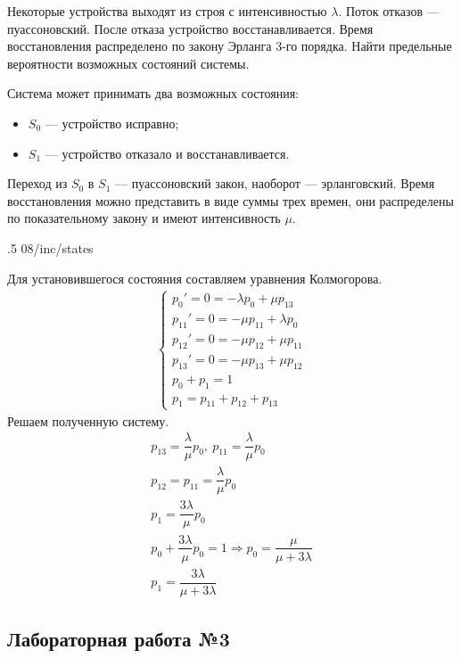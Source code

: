 Некоторые устройства выходят из строя с интенсивностью $\lambda$. Поток отказов --- пуассоновский. После отказа устройство восстанавливается. Время восстановления распределено по закону Эрланга 3-го порядка. Найти предельные вероятности возможных состояний системы.

Система может принимать два возможных состояния:

\begin{itemize}
    \item $S_0$ --- устройство исправно;
    \item $S_1$ --- устройство отказало и восстанавливается.
\end{itemize}

Переход из $S_0$ в $S_1$ --- пуассоновский закон, наоборот --- эрланговский. Время восстановления можно представить в виде суммы трех времен, они распределены по показательному закону и имеют интенсивность $\mu$.

\image
{.5\textwidth}
{08/inc/states}
{}

Для установившегося состояния составляем уравнения Колмогорова.
%
\begin{gather*}
    \begin{cases}
        p_0' = 0 = -\lambda p_0+\mu p_{13}    \\
        p_{11}' = 0 = -\mu p_{11}+\lambda p_0 \\
        p_{12}' = 0 = -\mu p_{12}+\mu p_{11}  \\
        p_{13}' = 0 = -\mu p_{13}+\mu p_{12}  \\
        p_0 + p_1 = 1                         \\
        p_1 = p_{11} + p_{12} + p_{13}
    \end{cases}
\end{gather*}
%
Решаем полученную систему.
%
\begin{gather*}
    p_{13} = \dfrac{\lambda}{\mu}p_0,\ p_{11} = \dfrac{\lambda}{\mu}p_0\\
    p_{12} = p_{11} = \dfrac{\lambda}{\mu}p_0\\
    p_1 = \dfrac{3\lambda}{\mu}p_0\\
    p_0 + \dfrac{3\lambda}{\mu}p_0 = 1\Rightarrow p_0 = \dfrac{\mu}{\mu + 3\lambda}\\
    p_1 = \dfrac{3\lambda}{\mu + 3\lambda}
\end{gather*}

\subsection{Лабораторная работа №3}

